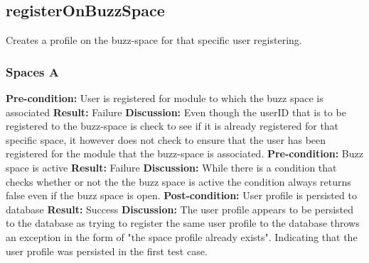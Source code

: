 
\newpage
\subsection{registerOnBuzzSpace}

Creates a profile on the buzz-space for that specific user registering.

\subsubsection{Spaces A}
\textbf{Pre-condition:}  User is registered for module to which the buzz space is associated \newline
\textbf{Result:} Failure\newline
\textbf{Discussion:} Even though the userID that is to be registered to the buzz-space is check to see if it is already registered for that specific space, it however does not check to ensure that the user has been registered for the module that the buzz-space is associated.
\newline \newline
\textbf{Pre-condition:}  Buzz space is active\newline
\textbf{Result:} Failure\newline
\textbf{Discussion:} While there is a condition that checks whether or not the the buzz space is active the condition always returns false even if the buzz space is open.  
\newline \newline
\textbf{Post-condition:} User profile is persisted to database \newline
\textbf{Result:} Success\newline
\textbf{Discussion:} The user profile appears to be persisted to the database as trying to register the same user profile to the database throws an exception in the form of "the space profile already exists". Indicating that the user profile was persisted in the first test case.
\newline \newline